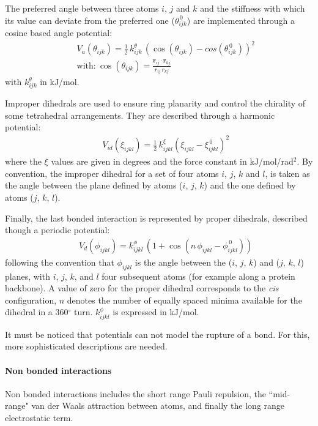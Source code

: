 The preferred angle between three atoms $i$, $j$ and $k$ and the stiffness with which its value can deviate from the preferred one ($\theta^{\, 0}_{ijk}$) are implemented through a cosine based angle potential:
\begin{eqnarray}
&& V_a(\theta_{ijk}) = \frac{1}{2}\,k^\theta_{ijk}\,\left(\cos\left(\theta_{ijk}\right) - cos\left(\theta^{\, 0}_{ijk}\right)\right)^2 \\
&& \text{with:} \ \cos\left(\theta_{ijk}\right) = \frac{\textbf{r}_{ij}\cdot \textbf{r}_{kj}}{r_{ij}\,r_{kj}}
\end{eqnarray}
with $k^\theta_{ijk}$ in kJ/mol.

Improper dihedrals are used to ensure ring planarity and control the chirality of some tetrahedral arrangements. They are described through a harmonic potential:
\begin{eqnarray}
&& V_{id} (\xi_{ijkl}) = \frac{1}{2}\,k_{ijkl}^\xi \left( \xi_{ijkl} - \xi_{ijkl}^{\, 0} \right)^2
\end{eqnarray}
where the $\xi$ values are given in degrees and the force constant in kJ/mol/rad$^2$. By convention, the improper dihedral for a set of four atoms $i$, $j$, $k$ and $l$, is taken as the angle between the plane defined by atoms ($i$, $j$, $k$) and the one defined by atoms ($j$, $k$, $l$).

Finally, the last bonded interaction is represented by proper dihedrals, described though a periodic potential:
\begin{eqnarray}
&& V_d(\phi_{ijkl}) = k_{ijkl}^\phi\,\left( 1 + \cos\left( n \, \phi_{ijkl} - \phi_{ijkl}^{\, 0} \right) \right)
\end{eqnarray}
following the convention that $\phi_{ijkl}$ is the angle between the ($i$, $j$, $k$) and ($j$, $k$, $l$) planes, with $i$, $j$, $k$, and $l$ four subsequent atoms (for example along a protein backbone). A value of zero for the proper dihedral corresponds to the \textit{cis} configuration, $n$ denotes the number of equally spaced minima available for the dihedral in a 360$^\circ$ turn. $k_{ijkl}^\phi$ is expressed in kJ/mol.

It must be noticed that potentials can not model the rupture of a bond. For this, more sophisticated descriptions are needed.


\paragraph{Non bonded interactions}

Non bonded interactions includes the short range Pauli repulsion, the ``mid-range" van der Waals attraction between atoms, and finally the long range electrostatic term.

